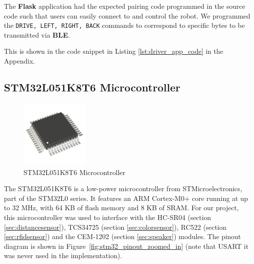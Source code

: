 \documentclass{article}
\begin{document}
\begin{minipage}{\linewidth}
    The \textbf{Flask} application had the expected pairing code programmed in the source code such that users can easily connect to and control the robot.
    We programmed the \texttt{DRIVE, LEFT, RIGHT, BACK} commands to correspond to specific bytes to be transmitted via \textbf{BLE}. \\
\end{minipage}

\begin{center}
    This is shown in the code snippet in Listing \ref{lst:driver_app_code} in the Appendix.
\end{center}

\subsection{STM32L051K8T6 Microcontroller}
\label{sec:stm32}

\begin{figure}[H]
    \centering
    \includegraphics[width=0.3\textwidth]{Figures/stm32.jpg} %
    \caption{STM32L051K8T6 Microcontroller}
    \label{fig:stm32}
\end{figure}

The STM32L051K8T6 is a low-power microcontroller from STMicroelectronics, part of the STM32L0 series. It features an ARM Cortex-M0+ core running at up to 32 MHz, with 64 KB of flash memory and 8 KB of SRAM. For our project, this microcontroller was used to interface with the HC-SR04 (section \ref{sec:distancesensor}), TCS34725 (section \ref{sec:colorsensor}), RC522 (section \ref{sec:rfidsensor}) and the CEM-1202 (section \ref{sec:speaker}) modules. The pinout diagram is shown in Figure~\ref{fig:stm32_pinout_zoomed_in} (note that USART it was never used in the implementation).
\end{document}
